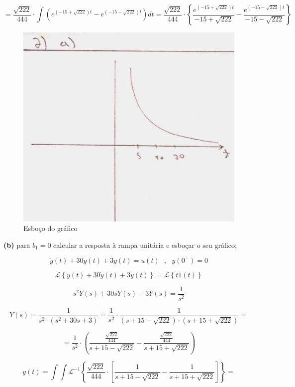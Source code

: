 \documentclass{article}
\begin{document}
\[ = \frac{\sqrt{222}}{444} \cdot \int (e^{(-15+\sqrt{222})t} - e^{(-15-\sqrt{222})t}) dt = \frac{\sqrt{222}}{444} \cdot \left\{ \frac{e^{(-15+\sqrt{222})t}}{-15+\sqrt{222}} - \frac{e^{(-15-\sqrt{222})t}}{-15-\sqrt{222}} \right\}  \]

\begin{figure}[h]
    \includegraphics[scale=0.2]{Q2_a.png}
    \centering
    \caption{Esboço do gráfico}
\end{figure}

\textbf{(b)} para $b_1 = 0$ calcular a resposta à rampa unitária e esboçar o seu gráfico;

\vspace{\baselineskip}

\[\ddot{y}(t) + 30\dot{y}(t) + 3y(t) = u(t)\,\,\,\,,\,\,\,\,y(0^{-}) = 0\]

\[\mathcal{L} \left\{\ddot{y}(t) + 30\dot{y}(t) + 3y(t)\right\} = \mathcal{L} \left\{t1(t)\right\}\]

\[ s^{2}Y(s) + 30sY(s) + 3Y(s) = \frac{1}{s^{2}} \]

\[ Y(s) = \frac{1}{s^{2} \cdot (s^{2} + 30s + 3)} = \frac{1}{s^{2}} \cdot \frac{1}{(s + 15 - \sqrt{222}) \cdot (s + 15 + \sqrt{222})} =\]

\[ = \frac{1}{s^{2}} \cdot \left(\frac{ \frac{\sqrt{222}}{444}}{s + 15 - \sqrt{222}} - \frac{\frac{\sqrt{222}}{444}}{s + 15 + \sqrt{222}}\right) \]

\[ y(t) = \int \int \mathcal{L}^{-1} \left\{\frac{\sqrt{222}}{444} \cdot \left[ \frac{1}{s + 15 - \sqrt{222}} - \frac{1}{s + 15 + \sqrt{222}} \right] \right\} = \]
\end{document}
